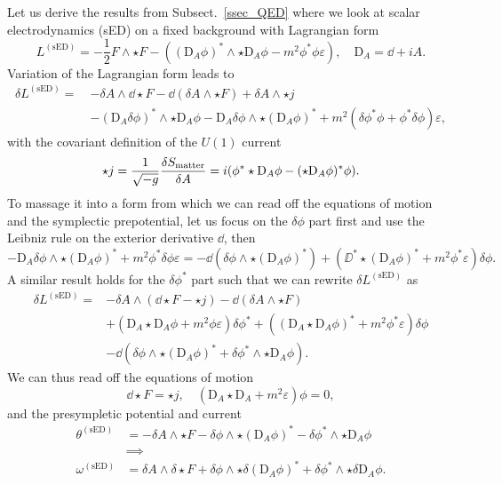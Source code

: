\documentclass[]{jkpaper}
\theoremstyle{plain}
\theoremstyle{definition}
\newcommand{\eps}{\varepsilon}
\newcommand{\DD}[1]{\text{D}_A#1}
\begin{document}
Let us derive the results from Subsect.~\ref{ssec_QED} where we look at scalar electrodynamics (sED) on a fixed background with Lagrangian form
\begin{equation}
    L^{(\text{sED})} = -\frac{1}{2} F \wedge \star F - ((\DD \phi)^* \wedge \star \DD \phi - m^2 \phi^* \phi \eps), \quad \DD = \dd + iA.
\end{equation}
Variation of the Lagrangian form leads to 
\begin{align}
    \delta L^{(\text{sED})} =~&- \delta A \wedge \dd \star F - \dd(\delta A \wedge \star F) + \delta A \wedge \star j \nonumber \\
    &-  (\DD \delta \phi)^* \wedge \star \DD \phi - \DD \delta \phi \wedge \star (\DD \phi)^*  + m^2 (\delta \phi^* \phi + \phi^* \delta \phi) \eps, 
\end{align}
with the covariant definition of the $U(1)$ current
\begin{equation}
    \star j = \frac{1}{\sqrt{-g}} \fdv{S_\text{matter}}{A} = i (\phi^* \star \DD \phi - (\star \DD \phi)^* \phi).
\end{equation}
To massage it into a form from which we can read off the equations of motion and the symplectic prepotential, let us focus on the $\delta \phi$ part first and use the Leibniz rule on the exterior derivative $\dd$, then
\begin{equation}
    -\DD \delta \phi \wedge \star (\DD \phi)^* + m^2  \phi^* \delta\phi \eps 
    = -\dd(\delta \phi \wedge \star (\DD \phi)^*) + (\DD^* \star (\DD \phi)^* + m^2\phi^* \eps) \delta \phi. 
\end{equation}
A similar result holds for the $\delta \phi^*$ part such that we can rewrite $\delta L^{(\text{sED})}$ as 
\begin{equation}
    \begin{split}
        \delta L^{(\text{sED})} = &-\delta A \wedge (\dd \star F - \star j) - \dd(\delta A \wedge \star F) \nonumber \\
    &+ (\DD \star \DD \phi + m^2 \phi \eps) \delta\phi^* + ((\DD \star \DD \phi)^* + m^2 \phi^* \eps) \delta \phi \\
    &- \dd(\delta \phi \wedge \star (\DD \phi)^* + \delta \phi^* \wedge \star \DD \phi).
    \end{split}
\end{equation}
We can thus read off the equations of motion
\begin{equation}
    \dd \star F = \star j, \quad (\DD \star \DD + m^2 \eps) \phi = 0,
\end{equation}
and the presympletic potential and current 
\begin{align}
    \theta^{(\text{sED})} &= - \delta A \wedge \star F - \delta \phi \wedge \star (\DD \phi)^* - \delta \phi^* \wedge \star \DD \phi \\ 
    &\implies\\ 
    \omega^{(\text{sED})} &= \delta A \wedge \delta \star F  + \delta \phi \wedge \star \delta (\DD \phi)^* + \delta \phi^* \wedge \star \delta \DD \phi.
\end{align}
\end{document}

